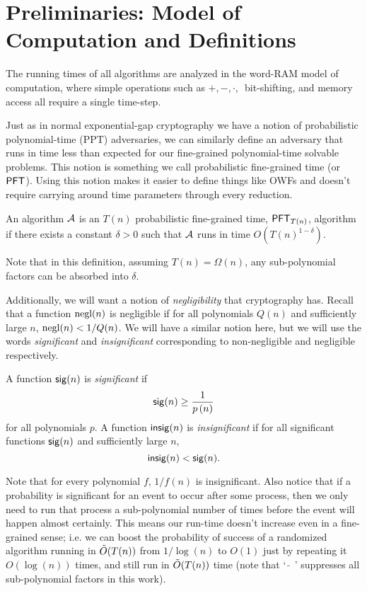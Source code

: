 \section{Preliminaries: Model of Computation and Definitions}\label{sec:prelims}

The running times of all algorithms are analyzed in the word-RAM model of computation, where simple operations such as $+, -, \cdot, \,$ bit-shifting, and memory access all require a single time-step.

Just as in normal exponential-gap cryptography we have a notion of probabilistic polynomial-time (PPT) adversaries, we can similarly define an adversary that runs in time less than expected for our fine-grained polynomial-time solvable problems. This notion is something we call probabilistic fine-grained time (or $\PFT{}$). Using this notion makes it easier to define things like OWFs and doesn't require carrying around time parameters through every reduction.

\begin{definition}
	An algorithm $\cA$ is an $T(n)$ probabilistic fine-grained time, $\PFT{T(n)}$, algorithm if there exists a constant $\delta > 0$ such that $\cA$ runs in time $O(T(n)^{1-\delta})$.
\end{definition}
Note that in this definition, assuming $T(n) = \Omega(n)$, any sub-polynomial factors can be absorbed into $\delta$.

Additionally, we will want a notion of \emph{negligibility} that cryptography has. Recall that a function $\negl(n)$ is negligible if for all polynomials $Q(n)$ and sufficiently large $n$, $\negl(n) < 1/Q(n)$. We will have a similar notion here, but we will use the words \emph{significant} and \emph{insignificant} corresponding to non-negligible and negligible respectively.


\begin{definition}
	A function $\sig(n)$ is \emph{significant} if 
	\[\sig(n) \ge \frac{1}{p\left(n\right)}\]
	for all polynomials $p$. A function $\insig(n)$ is \emph{insignificant} if for all significant functions $\sig(n)$ and sufficiently large $n$,
	\[\insig(n) < \sig(n).\]
\end{definition}

Note that for every polynomial $f$, $1/f(n)$ is insignificant. Also notice that if a probability is significant for an event to occur after some process, then we only need to run that process a sub-polynomial number of times before the event will happen almost certainly. This means our run-time doesn't increase even in a fine-grained sense; i.e. we can boost the probability of success of a randomized algorithm running in $\~O(T(n))$ from $1/\log(n)$ to $O(1)$ just by repeating it $O(\log(n))$ times, and still run in $\~O(T(n))$ time (note that ` $\tilde\ $ ' suppresses all sub-polynomial factors in this work).

